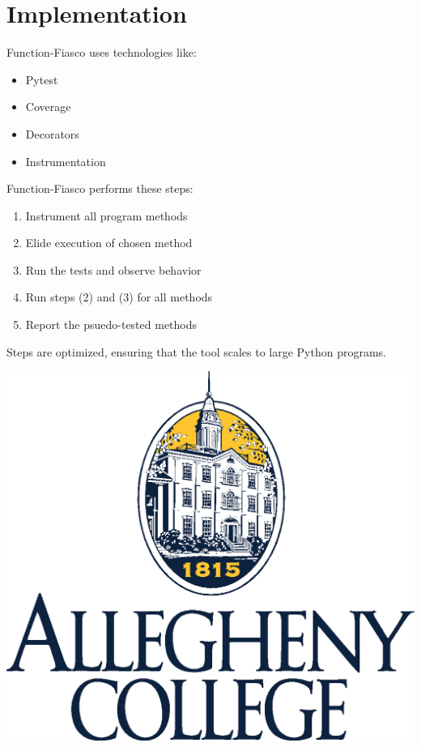 \documentclass[a0paper,fleqn]{betterposter}
\begin{document}
{  \section{Implementation}
  Function-Fiasco uses technologies like:

  \begin{itemize}

    \item Pytest
    \item Coverage
    \item Decorators
    \item Instrumentation

  \end{itemize}

  \vspace*{.5in}
  Function-Fiasco performs these steps:

  \begin{enumerate}[leftmargin=.5in]

    \item Instrument all program methods
    \item Elide execution of chosen method
    \item Run the tests and observe behavior
    \item Run steps (2) and (3) for all methods
    \item Report the psuedo-tested methods

  \end{enumerate}

  \vspace*{.25in}
  Steps are optimized, ensuring that the tool scales to large Python programs.
  \vspace*{.5in}

  \vfill

  \includegraphics[width=\textwidth]{img/CollegeLogo.eps}\\

}
\end{document}

